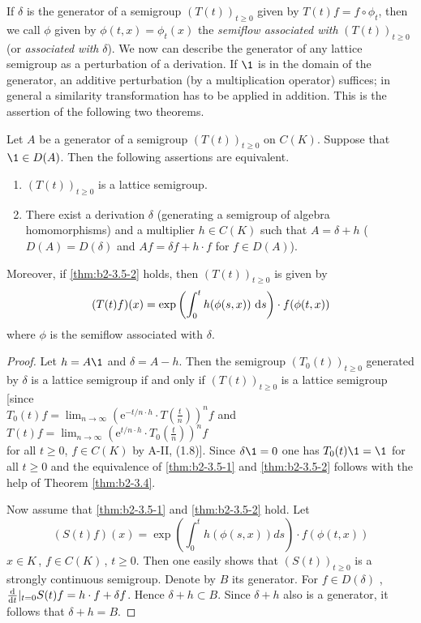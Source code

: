 If $\delta$ is the generator of a semigroup $(T(t))_{t \geq 0}$ given by $T(t)f = f \circ \phi_{t}$, then we call $\phi$ given by $\phi(t,x) = \phi_{t}(x)$ the \emph{semiflow associated with} $(T(t))_{t \geq 0}$ (or \emph{associated with} $\delta$).
We now can describe the generator of any lattice semigroup as a perturbation of a derivation.
If $\1$ is in the domain of the generator, an additive perturbation (by a multiplication operator) suffices; in general a similarity transformation has to be applied in addition.
This is the assertion of the following two theorems.

\begin{theorem}\label{thm:b2-3.5}
Let $A$ be a generator of a semigroup $(T(t))_{t \geq 0}$ on $C(K)$.
Suppose that $\1 \in D(A)$.
Then the following assertions are equivalent.
\begin{enumerate}[\upshape (a)]
\item \label{thm:b2-3.5-1}
$(T(t))_{t \geq 0}$ is a lattice semigroup.
\item \label{thm:b2-3.5-2}
There exist a derivation $\delta$ (generating a semigroup of algebra homomorphisms) and a multiplier $h \in C(K)$ such that $A = \delta + h$ (\ie  $D(A) = D(\delta)$ and $Af = \delta f + h \cdot f$ for $f \in D(A)$).
\end{enumerate}

Moreover, if \ref{thm:b2-3.5-2} holds, then $(T(t))_{t \geq 0}$ is given by
\begin{equation}\label{eq:b2-3.6}
(T(t)f)(x) = \exp\left(\int_{0}^{t} h(\phi(s,x))\,\mathop{}\!\mathrm{d}{s}\right) \cdot f(\phi(t,x))
\end{equation}
where $\phi$ is the semiflow associated with $\delta$.
\end{theorem}

\begin{proof}
Let $h = A\1$ and $\delta = A - h$.
Then the semigroup $(T_{0}(t))_{t \geq 0}$ generated by $\delta$ is a lattice semigroup if and only if $(T(t))_{t \geq 0}$ is a lattice semigroup [since \\
 $T_{0}(t)f = \lim_{n \to \infty} (\mathrm{e}^{-t/n \cdot h} \cdot T(\frac{t}{n}))^{n}f$ 
 and 
 $T(t)f = \lim_{n \to \infty} (\mathrm{e}^{t/n \cdot h} \cdot T_{0}(\frac{t}{n}))^{n}f$ \\
 for all $t \geq 0$, $f \in C(K)$ by
A-II, (1.8)].
Since $\delta \1 = 0$ one has $T_{0}(t)\1 = \1$ for all $t \geq 0$ and the equivalence of \ref{thm:b2-3.5-1} and \ref{thm:b2-3.5-2} follows with the help of Theorem \ref{thm:b2-3.4}.

Now assume that \ref{thm:b2-3.5-1} and \ref{thm:b2-3.5-2} hold.
Let
\[
(S(t)f) (x) = \exp\left( \int_{0}^{t} h(\phi(s,x))ds \right) \cdot f(\phi(t,x))
\]
$x \in K$\,, $f \in C (K)$\,, $t \geq 0$. 
Then one easily shows that $(S(t))_{t\geq 0}$ is a strongly con\-tinu\-ous semigroup.
Denote by $B$ its generator.
For $f \in D(\delta)$ , $\frac{\mathop{}\!\mathrm{d}{}}{\mathop{}\!\mathrm{d}{t}}|_{t = 0}S(t)f = h \cdot f + \delta f$.
Hence $\delta + h \subset B$.  Since $\delta + h$ also is a generator, it follows that $\delta + h = B$.
\end{proof}



